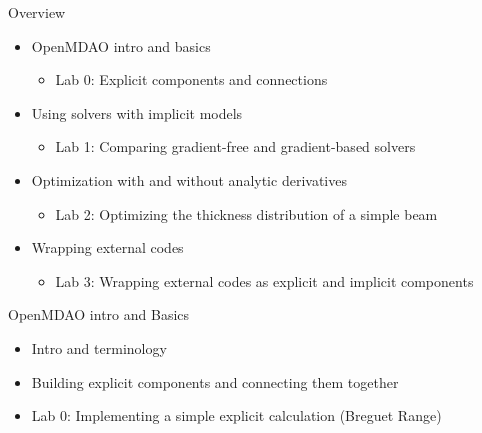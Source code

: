 \documentclass[aspectratio=169, usenames,dvipsnames, 14pt]{beamer}
\begin{document}
\begin{frame}{Overview}
    \begin{itemize}
        \item OpenMDAO intro and basics
          \begin{itemize}
            \item Lab 0: Explicit components and connections
          \end{itemize}
    \vspace{.5cm}
    
        \item Using solvers with implicit models
          \begin{itemize}
            \item Lab 1: Comparing gradient-free and gradient-based solvers
          \end{itemize}
    \vspace{.5cm}
    
        \item Optimization with and without analytic derivatives
          \begin{itemize}
              \item Lab 2: Optimizing the thickness distribution of a simple beam
          \end{itemize}
    \vspace{.5cm}
    
        \item Wrapping external codes
          \begin{itemize}
              \item Lab 3: Wrapping external codes as explicit and implicit components
          \end{itemize}
    \end{itemize}
    
\end{frame}
\begingroup
{}
\begin{frame}{OpenMDAO intro and Basics}

    \begin{itemize}
        \item Intro and terminology 
        \vspace{0.5cm}
        \item Building explicit components and connecting them together
        \vspace{0.5cm}
        \item Lab 0: Implementing a simple explicit calculation (Breguet Range)
    \end{itemize}
    
\end{frame}
\endgroup
\end{document}
